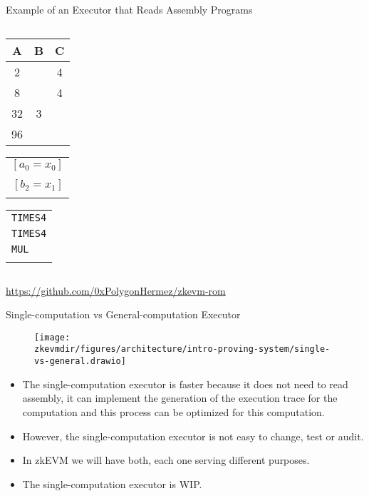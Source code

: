 \begin{frame} {Example of an Executor that Reads Assembly Programs}
\begin{columns}
\begin{column}{0.45\textwidth}
\begin{table}[h!]
\centering

\begin{tabular}{|c|c|c|}
\hline
\textbf{A} & \textbf{B} & \cellcolor{lightgray} \textbf{C} \\ \hline
2 &  & \cellcolor{lightgray} 4\\ \hline
8 & & \cellcolor{lightgray} 4 \\ \hline
32 & 3 & \cellcolor{lightgray} \\ \hline
96 & & \cellcolor{lightgray} \\ \hline
\end{tabular}
\hspace{1mm}
\begin{tabular}{r}
                    \\
$[a_0=x_0]$  \\
                    \\
$[b_2 = x_1]$         \\
                    \\

\end{tabular}
\hspace{1em}
\begin{tabular}{l}
                    \\
\texttt{TIMES4} \\
\texttt{TIMES4} \\
\texttt{MUL} \\
\\
\end{tabular}
\end{table}
\end{column}
\end{columns}

\footnotesize
\url{https://github.com/0xPolygonHermez/zkevm-rom}
\normalsize
\end{frame}




\begin{frame}{Single-computation vs General-computation Executor}
\begin{figure}
\texttt{[image: \\zkevmdir/figures/architecture/intro-proving-system/single-vs-general.drawio]}
\end{figure}
\begin{itemize}
\small
\item The single-computation executor is faster because it does not need
to read assembly, it can implement the generation of the execution trace for the computation and
this process can be optimized for this computation.
\item However, the single-computation executor is not easy to change, test or audit.
\item In zkEVM we will have both, each one serving different purposes.
\item The single-computation executor is WIP.
\end{itemize}
\end{frame}




